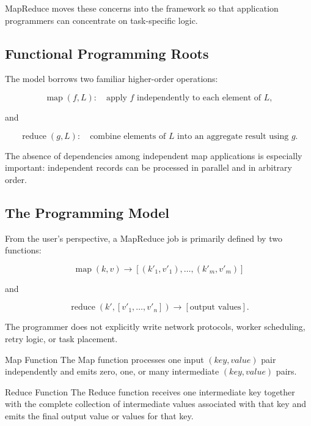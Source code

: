 \documentclass[11pt,a4paper,oneside]{book}
\begin{document}
MapReduce moves these concerns into the framework so that application programmers can concentrate on task-specific logic.

\subsection{Functional Programming Roots}

The model borrows two familiar higher-order operations:

\[
\operatorname{map}(f,L):
\quad
\text{apply }f\text{ independently to each element of }L,
\]

and

\[
\operatorname{reduce}(g,L):
\quad
\text{combine elements of }L\text{ into an aggregate result using }g.
\]

The absence of dependencies among independent map applications is especially important: independent records can be processed in parallel and in arbitrary order.

\subsection{The Programming Model}

From the user's perspective, a MapReduce job is primarily defined by two functions:

\begin{equation}
\operatorname{map}(k,v)
\longrightarrow
[(k'_1,v'_1),\ldots,(k'_m,v'_m)]
\label{eq:map-signature}
\end{equation}

and

\begin{equation}
\operatorname{reduce}\!\left(k', [v'_1,\ldots,v'_n]\right)
\longrightarrow
[\text{output values}].
\label{eq:reduce-signature}
\end{equation}

The programmer does not explicitly write network protocols, worker scheduling, retry logic, or task placement.

\begin{definitionbox}{Map Function}
The Map function processes one input \((key,value)\) pair independently and emits zero, one, or many intermediate \((key,value)\) pairs.
\end{definitionbox}

\begin{definitionbox}{Reduce Function}
The Reduce function receives one intermediate key together with the complete collection of intermediate values associated with that key and emits the final output value or values for that key.
\end{definitionbox}
\end{document}
